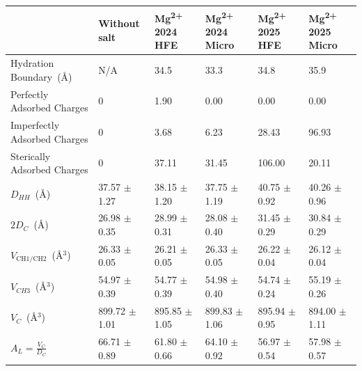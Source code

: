 \documentclass[journal=langd5,manuscript=article]{achemso}
\newcommand{\mg}{Mg\textsuperscript{2+}}
\begin{document}
\begin{table}
{\begin{tabularx}{\textwidth}{|X|X|X|X|X|X|}
        \hline                     & Without salt             &  \mg{ 2024} HFE     & \mg{ 2024} Micro    & \mg{ 2025} HFE    & \mg{ 2025} Micro \\\hline
    Hydration Boundary~(\AA)       & N/A                      &  34.5               & 33.3               & 34.8               & 35.9      \\\hline
    Perfectly Adsorbed Charges     & 0                        &  1.90               & 0.00               & 0.00               & 0.00      \\\hline
    Imperfectly Adsorbed Charges   & 0                        &  3.68               & 6.23               & 28.43              & 96.93     \\\hline
    Sterically Adsorbed Charges    & 0                        &  37.11              & 31.45              & 106.00             & 20.11     \\\hline
    $D_{HH}$~(\AA)                 & 37.57 $\pm$ 1.27         &  38.15 $\pm$ 1.20   & 37.75 $\pm$ 1.19   & 40.75 $\pm$ 0.92   & 40.26 $\pm$ 0.96\\\hline
    $2D_C$~(\AA)                   & 26.98 $\pm$ 0.35         &  28.99 $\pm$ 0.31   & 28.08 $\pm$ 0.40   & 31.45 $\pm$ 0.29   & 30.84 $\pm$ 0.29\\\hline
    $V_{\text{CH1/CH2}}$~(\AA$^3$) & 26.33 $\pm$ 0.05         &  26.21 $\pm$ 0.05   & 26.33 $\pm$ 0.05   & 26.22 $\pm$ 0.04   & 26.12 $\pm$ 0.04\\\hline
    $V_{CH3}$~(\AA$^3$)            & 54.97 $\pm$ 0.39         &  54.77 $\pm$ 0.39   & 54.98 $\pm$ 0.40   & 54.74 $\pm$ 0.24   & 55.19 $\pm$ 0.26\\\hline
    $V_C$~(\AA$^3$)                & 899.72 $\pm$ 1.01        &  895.85 $\pm$ 1.05  & 899.83 $\pm$ 1.06  & 895.94 $\pm$ 0.95  & 894.00 $\pm$ 1.11\\\hline
    $A_L=\frac{V_C}{D_C}$          & 66.71 $\pm$ 0.89         &  61.80 $\pm$ 0.66   & 64.10 $\pm$ 0.92   & 56.97 $\pm$ 0.54   & 57.98 $\pm$ 0.57\\\hline
    \end{tabularx}
}
\end{table}
\end{document}
